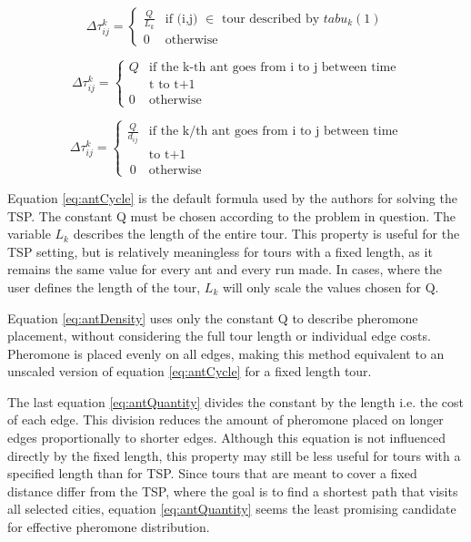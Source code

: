 \begin{equation}\label{eq:antCycle}
	\Delta\tau_{ij}^k = \begin{cases}
			\frac{Q}{L_k} &\text{if (i,j) $\in$ tour described by $tabu_k(1)$} \\
			0 &\text{otherwise}
	\end{cases}	
\end{equation}


\begin{equation}\label{eq:antDensity}
	\Delta\tau_{ij}^k = \begin{cases}
	Q &\text{if the k-th ant goes from i to j between time} \\
	&\text{t to t+1} \\
	0 &\text{otherwise}
\end{cases}	
\end{equation}


\begin{equation}\label{eq:antQuantity}
	\Delta\tau_{ij}^k = \begin{cases}
	\frac{Q}{d_{ij}} &\text{if the k/th ant goes from i to j between time} \\
		&\text{to t+1} \\\
	0 &\text{otherwise}
\end{cases}	
\end{equation}

Equation \ref{eq:antCycle} is the default formula used by the authors for solving the TSP.
The constant Q must be chosen according to the problem in question.
The variable $L_k$ describes the length of the entire tour.
This property is useful for the TSP setting, but is relatively meaningless for tours with a fixed length, as it remains the same value for every ant and every run made.
In cases, where the user defines the length of the tour, $L_k$ will only scale the values chosen for Q.

Equation \ref{eq:antDensity} uses only the constant Q to describe pheromone placement, without considering the full tour length or individual edge costs. 
Pheromone is placed evenly on all edges, making this method equivalent to an unscaled version of equation \ref{eq:antCycle} for a fixed length tour.

The last equation \ref{eq:antQuantity} divides the constant by the length i.e. the cost of each edge. 
This division reduces the amount of pheromone placed on longer edges proportionally to shorter edges. 
Although this equation is not influenced directly by the fixed length, this property may still be less useful for tours with a specified length than for TSP.
Since tours that are meant to cover a fixed distance differ from the TSP, where the goal is to find a shortest path that visits all selected cities, equation \ref{eq:antQuantity} seems the least promising candidate for effective pheromone distribution.

